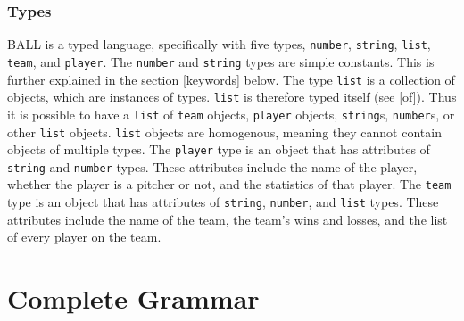 \subsubsection{Types}\label{types}
BALL is a typed language, specifically with five types,
\texttt{number}, \texttt{string}, \texttt{list}, \texttt{team}, and
\texttt{player}. The \texttt{number} and \texttt{string} types are
simple constants. This is further explained in the section
\ref{keywords} below. The type \texttt{list} is a collection of
objects, which are instances of types. \texttt{list} is therefore
typed itself (see \ref{of}). Thus it is possible to have a
\texttt{list} of \texttt{team} objects, \texttt{player} objects,
\texttt{string}s, \texttt{number}s, or other \texttt{list}
objects. \texttt{list} objects are homogenous, meaning they cannot
contain objects of multiple types. The \texttt{player} type is an
object that has attributes of \texttt{string} and \texttt{number}
types. These attributes include the name of the player, whether the
player is a pitcher or not, and the statistics of that player. The
\texttt{team} type is an object that has attributes of
\texttt{string}, \texttt{number}, and \texttt{list} types. These
attributes include the name of the team, the team's wins and losses,
and the list of every player on the team.














\pagebreak

\section{Complete Grammar}\label{grammar}


